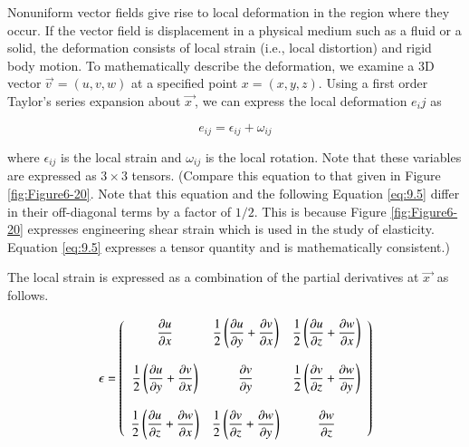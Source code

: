 Nonuniform vector fields give rise to local deformation in the region where they occur. If the vector field is displacement in a physical medium such as a fluid or a solid, the deformation consists of local strain (i.e., local distortion) and rigid body motion. To mathematically describe the deformation, we examine a 3D vector $\overrightarrow{v\ } = (u, v, w)$ at a specified point $x = (x, y, z)$. Using a first order Taylor's series expansion about $\overrightarrow{x\ }$, we can express the local deformation $e_ij$ as

\begin{equation}\label{eq:9.4}
e_{ij} = \epsilon_{ij} + \omega_{ij}
\end{equation}

where $\epsilon_{ij}$ is the local strain and $\omega_{ij}$ is the local rotation. Note that these variables are expressed as $3 \times 3$ tensors. (Compare this equation to that given in Figure \ref{fig:Figure6-20}. Note that this equation and the following Equation \ref{eq:9.5} differ in their off-diagonal terms by a factor of $1/2$. This is because Figure \ref{fig:Figure6-20} expresses engineering shear strain which is used in the study of elasticity. Equation \ref{eq:9.5} expresses a tensor quantity and is mathematically consistent.)

The local strain is expressed as a combination of the partial derivatives at $\overrightarrow{x\ }$ as follows.

\begin{equation}\label{eq:9.5}
\mathbf{\epsilon} = \left(
\begin{array}{c c c}
  \dfrac{\partial u}{\partial x} &
  \dfrac{1}{2}\left(\dfrac{\partial u}{\partial y} + \dfrac{\partial v}{\partial x}\right) &
  \dfrac{1}{2}\left(\dfrac{\partial u}{\partial z} + \dfrac{\partial w}{\partial x}\right) \\ \\
  \dfrac{1}{2}\left(\dfrac{\partial u}{\partial y} + \dfrac{\partial v}{\partial x}\right) &
  \dfrac{\partial v}{\partial y} &
  \dfrac{1}{2}\left(\dfrac{\partial v}{\partial z} + \dfrac{\partial w}{\partial y}\right) \\ \\
  \dfrac{1}{2}\left(\dfrac{\partial u}{\partial z} + \dfrac{\partial w}{\partial x}\right) &
  \dfrac{1}{2}\left(\dfrac{\partial v}{\partial z} + \dfrac{\partial w}{\partial y}\right) &
  \dfrac{\partial w}{\partial z}
\end{array}\right)
\end{equation}

